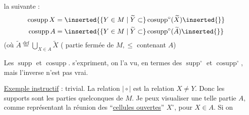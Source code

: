 
la suivante :
\[
\begin{aligned}
\operatorname{cosupp}X&=\inserted{\{Y\in M\mid\widetilde{Y}\subset}\operatorname{cosupp}^{\circ}(\widetilde{X})\inserted{\}}\\
\operatorname{cosupp}A&=\inserted{\{Y\in M\mid\widetilde{Y}\subset}\operatorname{cosupp}^{\circ}(\widetilde{A})\inserted{\}}
\end{aligned}
\]
(où $\widetilde{A}\overset{\mathrm{def}}{=}\bigcup_{X\in A}\widetilde{X}$ ( partie fermée de $M,\leq$ contenant $A$)



 Les $\operatorname{supp}$ et $\operatorname{cosupp}.$ s'expriment, on l'a vu, en termes des $\operatorname{supp}^{\circ}$ et $\operatorname{cosupp}^{\circ}$, mais l'inverse n'est pas vrai.

\uline{Exemple instructif} :  trivial. La relation $\mid\circ\mid$ est la relation $X\ne Y$. Donc les supports sont les parties quelconques de $M$. Je peux visualiser une telle partie $A$, comme représentant la réunion des ``\uline{cellules ouvertes}'' $X^{\circ}$, pour $X\in A$. Si on
